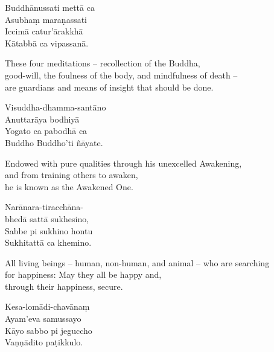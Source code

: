 


\begin{leader}
\end{leader}

Buddhānussati mettā ca\\
Asubhaṃ maraṇassati\\
Iccimā catur'ārakkhā\\
Kātabbā ca vipassanā.

\begin{english}
  These four meditations -- recollection of the Buddha,\\
  good-will, the foulness of the body, and mindfulness of death --\\
  are guardians and means of insight that should be done.
\end{english}

Visuddha-dhamma-santāno\\
Anuttarāya bodhiyā\\
Yogato ca pabodhā ca\\
Buddho Buddho'ti ñāyate.

\begin{english}
  Endowed with pure qualities through his unexcelled Awakening,\\
  and from training others to awaken,\\
  he is known as the Awakened One.
\end{english}

Narānara-tiracchāna-\\
bhedā sattā sukhesino,\\
Sabbe pi sukhino hontu\\
Sukhitattā ca khemino.

\begin{english}
  All living beings -- human, non-human, and animal -- who are searching\\
  for happiness: May they all be happy and,\\
  through their happiness, secure.
\end{english}

Kesa-lomādi-chavānaṃ\\
Ayam'eva samussayo\\
Kāyo sabbo pi jeguccho\\
Vaṇṇādito paṭikkulo.

